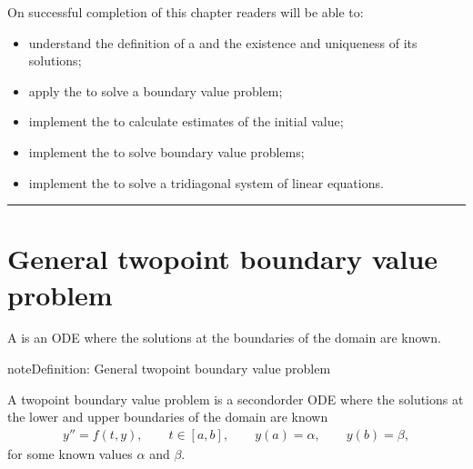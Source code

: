 \documentclass[letterpaper,10pt,english]{jupyterBook}
\begin{document}
\sphinxAtStartPar
On successful completion of this chapter readers will be able to:
\begin{itemize}
\item {} 
\sphinxAtStartPar
understand the definition of a {\hyperref[\detokenize{5_BVPs/5.0_BVPs:bvp-definition}]{}} and the existence and uniqueness of its solutions;

\item {} 
\sphinxAtStartPar
apply the {\hyperref[\detokenize{5_BVPs/5.1_Shooting_method:shooting-method-section}]{}} to solve a boundary value problem;

\item {} 
\sphinxAtStartPar
implement the {\hyperref[\detokenize{5_BVPs/5.1_Shooting_method:secant-method-section}]{}} to calculate estimates of the initial value;

\item {} 
\sphinxAtStartPar
implement the {\hyperref[\detokenize{5_BVPs/5.2_Finite_difference_method:finite-difference-method-section}]{}} to solve boundary value problems;

\item {} 
\sphinxAtStartPar
implement the {\hyperref[\detokenize{5_BVPs/5.2_Finite_difference_method:thomas-method-definition}]{}} to solve a tridiagonal system of linear equations.

\end{itemize}


\bigskip\hrule\bigskip



\section{General two\sphinxhyphen{}point boundary value problem}
\label{\detokenize{5_BVPs/5.0_BVPs:general-two-point-boundary-value-problem}}\label{\detokenize{5_BVPs/5.0_BVPs:bvp-section}}
\sphinxAtStartPar
A  is an ODE where the solutions at the boundaries of the domain are known.

\begin{sphinxadmonition}{note}{Definition: General two\sphinxhyphen{}point boundary value problem}

\sphinxAtStartPar
A two\sphinxhyphen{}point boundary value problem is a second\sphinxhyphen{}order ODE where the solutions at the lower and upper boundaries of the domain are known
\begin{equation}\label{equation:5_BVPs/5.0_BVPs:bvp-equation}
\begin{split}y'' = f(t,y),\qquad  t\in [a, b],\qquad y(a) = \alpha ,\qquad y(b) = \beta,\end{split}
\end{equation}
\sphinxAtStartPar
for some known values \(\alpha\) and \(\beta\).
\end{sphinxadmonition}
\end{document}
